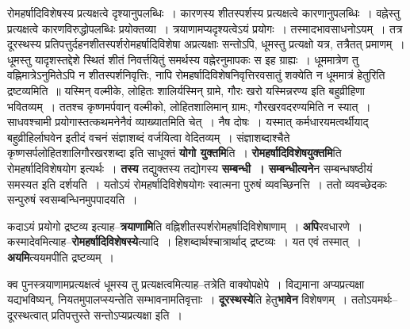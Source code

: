 \documentclass[article,12pt,a4paper]{memoir}
\begin{document}
	रोमहर्षादिविशेषस्य प्रत्यक्षत्वे दृश्यानुपलब्धिः । कारणस्य शीतस्पर्शस्य प्रत्यक्षत्वे कारणानुपलब्धिः । वह्नेस्तु प्रत्यक्षत्वे कारणविरुद्धोपलब्धिः प्रयोक्तव्या । त्रयाणामप्यदृश्यत्वेऽयं प्रयोगः । तस्मादभावसाधनोऽयम् । तत्र दूरस्थस्य प्रतिपत्तुर्दहनशीतस्पर्शरोमहर्षादिविशेषा अप्रत्यक्षाः सन्तोऽपि, धूमस्तु प्रत्यक्षो यत्र, तत्रैतत् प्रमाणम् । धूमस्तु यादृशस्तद्देशे स्थितं शीतं निवर्त्तयितुं समर्थस्य वह्नेरनुमापकः स इह ग्राह्यः । धूममात्रेण तु वह्निमात्रेऽनुमितेऽपि न शीतस्पर्शनिवृत्तिः, नापि रोमहर्षादिविशेषनिवृत्तिरवसातुं शक्येति न धूममात्रं हेतुरिति द्रष्टव्यमिति ॥ यस्मिन् वल्मीके, लोहितः शालिर्यस्मिन् ग्रामे, गौरः खरो यस्मिन्नरण्य इति बहुव्रीहिणा भवितव्यम् । ततश्च कृष्णमर्पवान् वल्मीको, लोहितशालिमान् ग्रामः, गौरखरवदरण्यमिति न स्यात् । साधवश्चामी प्रयोगास्तत्कथमनेनैवं व्याख्यातमिति चेत् । नैष दोषः । यस्मात् कर्मधारयमत्वर्थीयाद् बहुव्रीहिर्लाघवेन इतीदं वचनं संज्ञाशब्दं वर्जयित्वा वेदितव्यम् । संज्ञाशब्दाश्चैते कृष्णसर्पलोहितशालिगौरखरशब्दा इति साधूक्तं \textbf{योगो युक्तमि}ति । \textbf{रोमहर्षादिविशेषयुक्तमि}ति रोमहर्षादिविशेषयोग इत्यर्थः । \textbf{तस्य} तद्युक्तस्य तद्योगस्य \textbf{सम्बन्धी । सम्बन्धीत्यने}न सम्बन्धषष्ठीयं समस्यत इति दर्शयति । यतोऽयं रोमहर्षादिविशेषयोगः स्वात्मना पुरुषं व्यवच्छिनत्ति । ततो व्यवच्छेदकः सन्पुरुषं स्वसम्बन्धिनमुपपादयति ।
	\pend
      

	  \pstart कदाऽयं प्रयोगो द्रष्टव्य इत्याह--\textbf{त्रयाणामि}ति वह्निशीतस्पर्शरोमहर्षादिविशेषाणाम् । \textbf{अपि}रवधारणे । कस्मादेवमित्याह--\textbf{रोमहर्षादिविशेषस्ये}त्यादि । हिशब्दार्थश्चात्रार्थाद् द्रष्टव्यः । यत एवं तस्मात् । \leavevmode{} \textbf{अयमि}त्ययमपीति द्रष्टव्यम् ।
	\pend
      

	  \pstart क्व पुनस्त्रयाणामप्रत्यक्षत्वं धूमस्य तु प्रत्यक्षत्वमित्याह--तत्रेति वाक्योपक्षेपे । विद्यमाना अप्यप्रत्यक्षा यद्यभविष्यन्, नियतमुपालप्स्यन्तेति सम्भावनामतिवृत्ताः । \textbf{दूरस्थस्ये}ति हेतु\textbf{भावेन} विशेषणम् । ततोऽयमर्थः--दूरस्थत्वात् प्रतिपत्तुस्ते सन्तोऽप्यप्रत्यक्षा इति ।
	\pend
      
\end{document}
